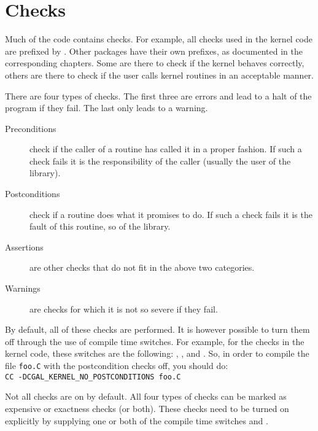 

\section{Checks}

Much of the {\cgal} code contains checks. 
For example, all checks used in the kernel code are prefixed by 
.
Other packages have their own prefixes, as documented in the corresponding
chapters.
Some are there to check if the kernel behaves correctly, others are there to 
check if the user calls kernel routines in an acceptable manner.

There are four types of checks. 
The first three are errors and lead to a halt of the program if they fail. 
The last only leads to a warning.
\begin{description}
\item[Preconditions] check if the caller of a routine has called it in a
proper fashion. 
If such a check fails it is the responsibility of the caller 
(usually the user of the library).
\item[Postconditions] check if a routine does what it promises to do. 
If such a check fails it is the fault of this routine, so of the library.
\item[Assertions] are other checks that do not fit in the above two 
categories.
\item[Warnings] are checks for which it is not so severe if they fail.
\end{description}

By default, all of these checks are performed. 
It is however possible to turn them off through the use of compile time 
switches.
For example, for the checks in the kernel code, these switches are the 
following:
, 
,
 and 
.
So, in order to compile the file \verb~foo.C~ with the postcondition checks
off, you should do:\\
\verb~CC -DCGAL_KERNEL_NO_POSTCONDITIONS foo.C~

Not all checks are on by default.
All four types of checks can be marked as expensive or exactness checks
(or both).
These checks need to be turned on explicitly by supplying one or both of
the compile time switches  and 
.

